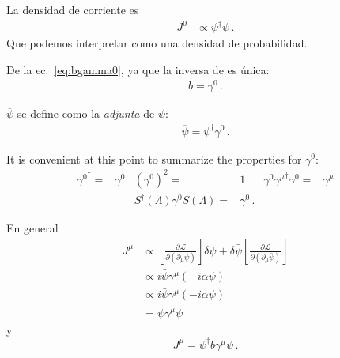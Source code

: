 La  densidad de corriente es
\begin{align}
  J^0&\propto \psi^\dagger\psi\,.
\end{align}
Que podemos interpretar como una densidad de probabilidad.

De la ec.~\eqref{eq:bgamma0}, ya que la inversa de es única:
\begin{align}
  b=\gamma^0\,.
\end{align}
 
$\overline{\psi}$ se define como la \emph{adjunta} de $\psi$:
 \begin{align}
   \overline{\psi}=\psi^\dagger\gamma^0\,.
 \end{align}

It is convenient at this point to summarize the properties for $\gamma^0$:
\begin{align}
  {\gamma^0}^\dagger=&\gamma^0 & \left(\gamma^0\right)^2=&1 & \gamma^0{\gamma^\mu}^\dagger\gamma^0=&\gamma^\mu\nonumber\\
 &&   S^\dagger(\Lambda)\gamma^0S(\Lambda)=&\gamma^0\,. &&
\end{align}



En general
\begin{align}
   J^\mu&\propto\left[\frac{\partial\mathcal{L}}{\partial\left(\partial_\mu\psi\right)}\right]\delta\psi+\delta\bar{\psi}\left[\frac{\partial\mathcal{L}}{\partial\left(\partial_\mu\bar{\psi}\right)}\right]\nonumber\\
   &\propto i\bar{\psi}\gamma^\mu(-i\alpha\psi)\nonumber\\
   &\propto i\bar{\psi}\gamma^\mu(-i\alpha\psi)\nonumber\\
   &=\bar{\psi}\gamma^\mu\psi
\end{align}
y
\begin{equation}
     J^\mu=\psi^\dagger b \gamma^\mu\psi\,.
\end{equation}


